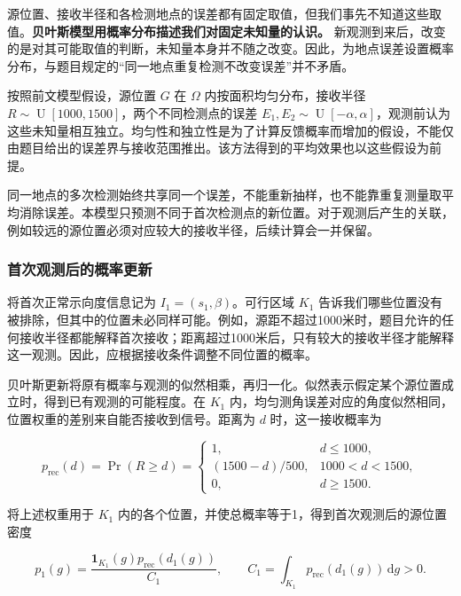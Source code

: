 \documentclass[UTF8,a4paper,zihao=-4,fontset=none]{ctexart}
\begin{document}
源位置、接收半径和各检测地点的误差都有固定取值，但我们事先不知道这些取值。\textbf{贝叶斯模型用概率分布描述我们对固定未知量的认识。} 新观测到来后，改变的是对其可能取值的判断，未知量本身并不随之改变。因此，为地点误差设置概率分布，与题目规定的“同一地点重复检测不改变误差”并不矛盾。

按照前文模型假设，源位置 \(G\) 在 \(\Omega\) 内按面积均匀分布，接收半径 \(R\sim\operatorname{U}[1000,1500]\)，两个不同检测点的误差 \(E_1,E_2\sim\operatorname{U}[-\alpha,\alpha]\)，观测前认为这些未知量相互独立。均匀性和独立性是为了计算反馈概率而增加的假设，不能仅由题目给出的误差界与接收范围推出。该方法得到的平均效果也以这些假设为前提。

同一地点的多次检测始终共享同一个误差，不能重新抽样，也不能靠重复测量取平均消除误差。本模型只预测不同于首次检测点的新位置。对于观测后产生的关联，例如较远的源位置必须对应较大的接收半径，后续计算会一并保留。

\subsubsection{首次观测后的概率更新}

将首次正常示向度信息记为 \(I_1=(s_1,\beta)\)。可行区域 \(K_1\) 告诉我们哪些位置没有被排除，但其中的位置未必同样可能。例如，源距不超过1000米时，题目允许的任何接收半径都能解释首次接收；距离超过1000米后，只有较大的接收半径才能解释这一观测。因此，应根据接收条件调整不同位置的概率。

贝叶斯更新将原有概率与观测的似然相乘，再归一化。似然表示假定某个源位置成立时，得到已有观测的可能程度。在 \(K_1\) 内，均匀测角误差对应的角度似然相同，位置权重的差别来自能否接收到信号。距离为 \(d\) 时，这一接收概率为

\begin{equation}
 p_{\mathrm{rec}}(d)=\Pr(R\ge d)=
 \begin{cases}
 1,&d\le1000,\\
 (1500-d)/500,&1000<d<1500,\\
 0,&d\ge1500.
 \end{cases}
\label{eq:q2-pair-weight}
\end{equation}

将上述权重用于 \(K_1\) 内的各个位置，并使总概率等于1，得到首次观测后的源位置密度

\begin{equation}
 p_1(g)=\frac{\mathbf1_{K_1}(g)p_{\mathrm{rec}}(d_1(g))}{C_1},
 \qquad C_1=\int_{K_1}p_{\mathrm{rec}}(d_1(g))\,\mathrm dg>0.
\label{eq:q2-pair-posterior}
\end{equation}
\end{document}
